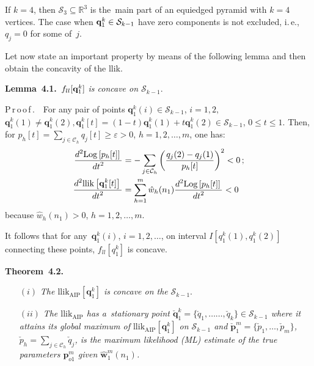 \begin{multicols}{2}
 If $k=4$, then   $\mathcal{S}_3 \subseteq \mathbb R^3$ is the~main part of an equiedged pyramid with $k=4$ vertices.
 The case when ${\bf q}_1^k \in \mathcal{S}_{k-1}$ have zero components is not excluded, 
  i.\,e., $q_j =0$ for some of~$j$.

Let now state an important property by means of the following  
lemma and then obtain the concavity of the llik.

\smallskip

\noindent
\textbf{Lemma~4.1.}\ 
\textit{$f_{ll} [{\bf q}_1^k]$ is concave on $\mathcal{S}_{k-1}$}.

\smallskip

\noindent
{P\,r\,o\,o\,f\,.}\ \
For any pair of points $\mathbf{q}_1^k (i)\in \mathcal{S}_{k-1}$, $i=1, 2,$
 $\mathbf{q}_1^k(1) \not= \mathbf{q}_1^k(2), \mathbf{q}_1^k [t] =(1-t) \mathbf{q}_1^k (1) +
 t \mathbf{q}_1^k (2) \in\mathcal{S}_{k-1}$,
 $0\le t\le 1.$ Then, for $p_h [t] =\sum_{j\in\mathcal{C}_h} q_j [t] \ge \varepsilon >0$, 
 $h=1, 2,\ldots, m$, one has:
\begin{align*}
 \displaystyle\frac{\displaystyle  d^2 \mathrm{Log} \left[p_h[t]\right]\mathstrut}{\displaystyle dt^2\mathstrut} &=- \sum\limits_{j\in \mathcal{C}_h}
 \left (\displaystyle\frac{\displaystyle q_j(2)-q_j(1)\mathstrut}{\displaystyle p_h[t]\mathstrut}\right )^2<0\,;
\\
 \displaystyle\frac{\displaystyle d^2 \mathrm{llik} \left[\mathbf{q}_1^k[t]\right]\mathstrut}{\displaystyle dt^2\mathstrut}& = 
 \sum\limits_{h=1}^m \hat{w}_h (n_1) \displaystyle\frac{\displaystyle d^2 \mathrm{Log} \left[p_h[t]\right]\mathstrut}{\displaystyle dt^2\mathstrut}< 0
\end{align*}
 because $\hat w_h(n_1) >0$, $h=1,2,\ldots, m$.

It follows that for any~$\mathbf{q}_1^k(i)$, 
$i=1, 2,\ldots$, on interval $I[q_1^k (1), q_1^k (2)]$
connecting these points, $f_{ll} [q_1^k ]$ is concave.

\smallskip

\noindent
\textbf{Theorem~4.2.}\
\begin{itemize}
\item[$(i)$] \textit{The $\mathrm{llik}_{\mathrm{AIP}} 
[\mathbf{q}_1^k]$ is concave on the}
  $\mathcal{S}_{k-1}.$
\item[$(ii)$] \textit{The $ \mathrm{llik}_{\mathrm{AIP}}$  has a~stationary point 
$\check{\mathbf{q}}_1^k =\{ \check q_1, \ldots$\linebreak $\ldots,
  \check q_k\} \in \mathcal{S}_{k-1}$ where it attains its global
  maximum of  $\mathrm{llik}_{\mathrm{AIP}} [\mathbf{q}_1^k]$ on $\mathcal{S}_{k-1}$
  and
  $\check{\mathbf{p}}_1^m= \{ \check p_1, \ldots, \check p_m\}$, 
  $\check p_h =\sum_{j\in \mathcal{C}_h} \check q_j$,
   is the maximum likelihood (ML) estimate of the true parameters 
   $ \mathbf{p}_{o1}^m$ given $\hat{\mathbf{w}}_1^{m} (n_1)$.}
\end{itemize}


\end{multicols}
